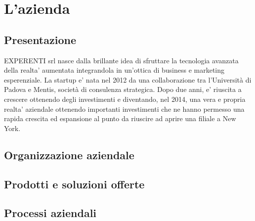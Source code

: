\section{L'azienda}
\subsection{Presentazione}
EXPERENTI srl nasce dalla brillante idea di sfruttare la tecnologia avanzata della realta' aumentata integrandola in un'ottica di business e marketing esperenziale.
La startup e' nata nel 2012 da una collaborazione tra l’Università di Padova e Mentis, società di consulenza strategica. Dopo due anni, e' riuscita a crescere ottenendo degli investimenti e diventando, nel 2014, una vera e propria realta' aziendale ottenendo importanti investimenti che ne hanno permesso una rapida crescita ed espansione al punto da riuscire ad aprire una filiale a New York.

\subsection{Organizzazione aziendale}

\subsection{Prodotti e soluzioni offerte}

\subsection{Processi aziendali}
